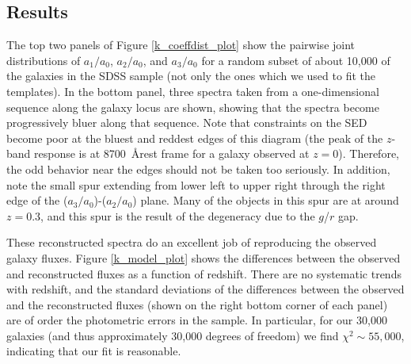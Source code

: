 \documentclass[10pt,preprint]{aastex}
\begin{document}

\subsection{Results}

The top two panels of Figure \ref{k_coeffdist_plot} show the pairwise
joint distributions of $a_1/a_0$, $a_2/a_0$, and $a_3/a_0$ for a
random subset of about 10,000 of the galaxies in the SDSS sample (not
only the ones which we used to fit the templates). In the bottom
panel, three spectra taken from a one-dimensional sequence along the
galaxy locus are shown, showing that the spectra become progressively
bluer along that sequence. Note that constraints on the SED become
poor at the bluest and reddest edges of this diagram (the peak of the
$z$-band response is at 8700~\AA rest frame for a galaxy observed at
$z=0$). Therefore, the odd behavior near the edges should not be taken
too seriously. In addition, note the small spur extending from lower
left to upper right through the right edge of the
($a_3/a_0$)-($a_2/a_0$) plane. Many of the objects in this spur are at
around $z=0.3$, and this spur is the result of the degeneracy due to
the $g$/$r$ gap.

These reconstructed spectra do an excellent job of reproducing the
observed galaxy fluxes. Figure \ref{k_model_plot} shows the
differences between the observed and reconstructed fluxes as a
function of redshift. There are no systematic trends with redshift,
and the standard deviations of the differences between the observed
and the reconstructed fluxes (shown on the right bottom corner of each
panel) are of order the photometric errors in the sample. In
particular, for our 30,000 galaxies (and thus approximately 30,000
degrees of freedom) we find $\chi^2 \sim 55,000$, indicating that our
fit is reasonable. 
\end{document}
